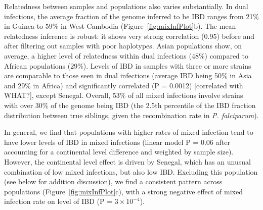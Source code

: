 \documentclass[9pt,lineno]{elife}
\begin{document}
Relatedness between samples and populations also varies substantially.  In dual infections, the average fraction of the genome inferred to be IBD ranges from 21\% in Guinea to 59\% in West Cambodia (Figure~\ref{fig:mixInfPlot}b). The mean relatedness inference is robust: it shows very strong correlation (0.95) before and after filtering out samples with poor haplotypes.  Asian populations show, on average, a higher level of relatedness within dual infections (48\%) compared to African populations (29\%).  Levels of IBD in samples with three or more strains are comparable to those seen in dual infections (average IBD being 50\% in Asia and 29\% in Africa) and significantly correlated (P = 0.0012) [correlated with WHAT?], except Senegal.  Overall, 53\% of all mixed infections involve strains with over 30\% of the genome being IBD (the 2.5th percentile of the IBD fraction distribution between true siblings, given the recombination rate in {\it P. falciparum}).

In general, we find that populations with higher rates of mixed infection tend to have lower levels of IBD in mixed infections (linear model P = 0.06 after accounting for a continental level difference and weighted by sample size).  However, the continental level effect is driven by Senegal, which has an unusual combination of low mixed infections, but also low IBD.  Excluding this population (see below for addition discussion), we find a consistent pattern across populations (Figure~\ref{fig:mixInfPlot}c), with a strong negative effect of mixed infection rate on level of IBD (P = $3\times10^{-4}$).

\end{document}
